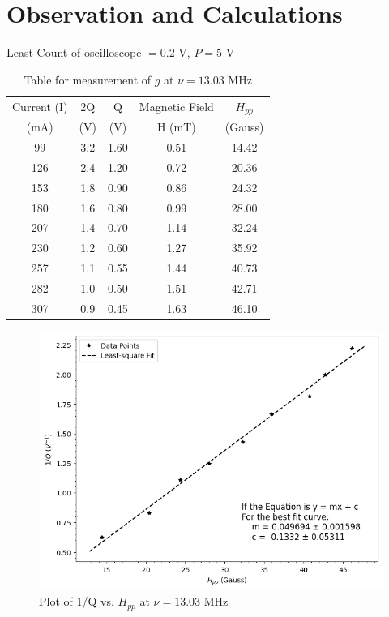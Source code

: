 \section{Observation and Calculations}

\noindent Least Count of oscilloscope $=0.2$ V, $P = 5$ V

\begin{table}[H]
    \centering
        \caption{Table for measurement of $g$ at $\nu= 13.03$ MHz}
        \begin{tabular}{|c|c|c|c|c|} \hline
        Current (I) & 2Q & Q & Magnetic Field & $H_{pp}$ \\ 
        (mA) & (V) & (V) & H (mT) & (Gauss)\\ \hline
        99 & 3.2 & 1.60  & 0.51 & 14.42 \\
        126 & 2.4 & 1.20  & 0.72 & 20.36 \\
        153 & 1.8 & 0.90  & 0.86 & 24.32 \\
        180 & 1.6 & 0.80  & 0.99 & 28.00   \\
        207 & 1.4 & 0.70  & 1.14 & 32.24 \\
        230 & 1.2 & 0.60  & 1.27 & 35.92 \\
        257 & 1.1 & 0.55 & 1.44 & 40.73 \\
        282 & 1.0 & 0.50  & 1.51 & 42.71 \\
        307 & 0.9 & 0.45 & 1.63 & 46.10 \\ \hline
    \end{tabular}    
    \label{tab:1}
\end{table}

\begin{figure}[H]
    \centering
    \includegraphics[width=1\columnwidth]{images/1.png}
    \caption{Plot of 1/Q vs. $H_{pp}$ at $\nu= 13.03$ MHz}
    \label{g1}
\end{figure}

